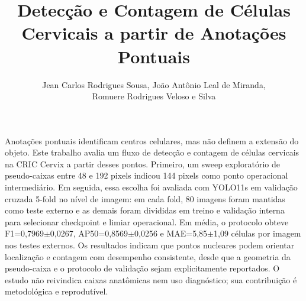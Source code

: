 \documentclass[12pt]{article}
\title{Detec\c{c}\~ao e Contagem de C\'elulas Cervicais a partir de Anota\c{c}\~oes Pontuais}
\author{Jean Carlos Rodrigues Sousa\inst{1}, Jo\~ao Ant\^onio Leal de Miranda\inst{1},\\
Romuere Rodrigues Veloso e Silva\inst{1}}
\begin{document}
\maketitle

\begin{resumo}
Anota\c{c}\~oes pontuais identificam centros celulares, mas n\~ao definem a
extens\~ao do objeto. Este trabalho avalia um fluxo de detec\c{c}\~ao e contagem
de c\'elulas cervicais na CRIC Cervix a partir desses pontos. Primeiro, um sweep
explorat\'orio de pseudo-caixas entre 48 e 192 pixels indicou 144 pixels como
ponto operacional intermedi\'ario. Em seguida, essa escolha foi avaliada com
YOLO11s em valida\c{c}\~ao cruzada 5-fold no n\'ivel de imagem: em cada fold, 80
imagens foram mantidas como teste externo e as demais foram divididas em treino
e valida\c{c}\~ao interna para selecionar checkpoint e limiar operacional. Em
m\'edia, o protocolo obteve F1=0,7969$\pm$0,0267, AP50=0,8569$\pm$0,0256 e
MAE=5,85$\pm$1,09 c\'elulas por imagem nos testes externos. Os
resultados indicam que pontos nucleares podem orientar localiza\c{c}\~ao e
contagem com desempenho consistente, desde que a geometria da pseudo-caixa e o
protocolo de valida\c{c}\~ao sejam explicitamente reportados. O estudo n\~ao
reivindica caixas anat\^omicas nem uso diagn\'ostico; sua contribui\c{c}\~ao \'e
metodol\'ogica e reprodut\'ivel.
\end{resumo}









\end{document}

